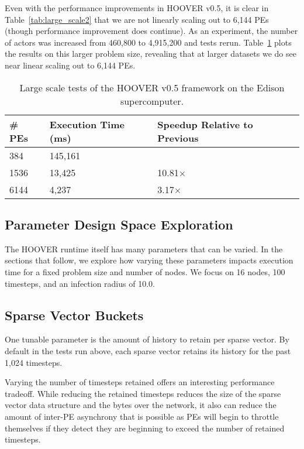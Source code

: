 Even with the performance improvements in HOOVER v0.5, it is clear in
Table~\ref{tab:large_scale2} that we are not linearly scaling out to 6,144 PEs
(though performance improvement does continue). As an experiment, the number of
actors was increased from 460,800 to 4,915,200 and tests rerun.
Table~\ref{tab:large_scale3} plots the results on this larger problem size,
revealing that at larger datasets we do see near linear scaling out to 6,144 PEs.

\begin{table}
\centering
\begin{tabularx}{\textwidth}{ | X || X | X |}
\hline
    \textbf{\# PEs}             & \textbf{Execution Time (ms)} & \textbf{Speedup Relative to Previous} \\\hline
    384                         & 145,161 &               \\\hline
    1536                        & 13,425  & 10.81$\times$ \\\hline
    6144                        & 4,237   & 3.17$\times$  \\\hline
\end{tabularx}
\caption{Large scale tests of the HOOVER v0.5 framework on the Edison supercomputer.}
\label{tab:large_scale3}
\end{table}

\subsection{Parameter Design Space Exploration}

The HOOVER runtime itself has many parameters that can be varied. In the
sections that follow, we explore how varying these parameters impacts execution
time for a fixed problem size and number of nodes. We focus on 16 nodes, 100
timesteps, and an infection radius of 10.0.

\subsection{Sparse Vector Buckets}

One tunable parameter is the amount of history to retain per sparse vector. By
default in the tests run above, each sparse vector retains its history for the
past 1,024 timesteps.

Varying the number of timesteps retained offers an interesting performance
tradeoff. While reducing the retained timesteps reduces the size of the sparse
vector data structure and the bytes over the network, it also can reduce the amount
of inter-PE asynchrony that is possible as PEs will begin to throttle themselves
if they detect they are beginning to exceed the number of retained timesteps.

